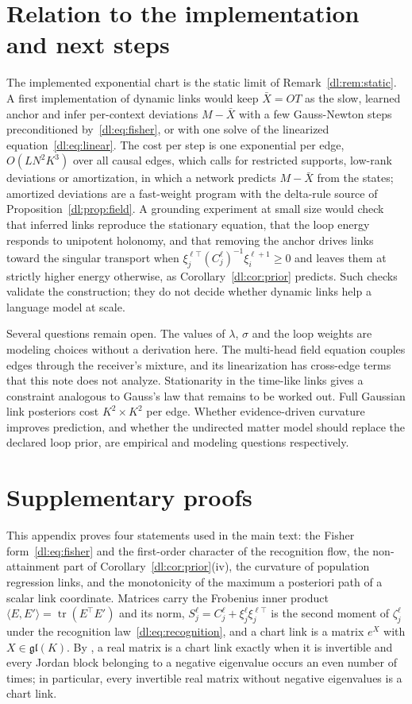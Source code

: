 \documentclass[11pt]{article}
\theoremstyle{definition}
\theoremstyle{remark}
\providecommand{\gl}{\mathfrak{gl}}
\providecommand{\tr}{\operatorname{tr}}
\begin{document}
\section{Relation to the implementation and next steps}
\label{dl:sec:next}

The implemented exponential chart is the static limit of Remark~\ref{dl:rem:static}. A first implementation of dynamic links would keep $\bar X=OT$ as the slow, learned anchor and infer per-context deviations $M-\bar X$ with a few Gauss-Newton steps preconditioned by~\eqref{dl:eq:fisher}, or with one solve of the linearized equation~\eqref{dl:eq:linear}. The cost per step is one exponential per edge, $O(LN^2K^3)$ over all causal edges, which calls for restricted supports, low-rank deviations or amortization, in which a network predicts $M-\bar X$ from the states; amortized deviations are a fast-weight program with the delta-rule source of Proposition~\ref{dl:prop:field}. A grounding experiment at small size would check that inferred links reproduce the stationary equation, that the loop energy responds to unipotent holonomy, and that removing the anchor drives links toward the singular transport when $\xi_j^{\ell\top}(C_j^\ell)^{-1}\xi_i^{\ell+1}\ge0$ and leaves them at strictly higher energy otherwise, as Corollary~\ref{dl:cor:prior} predicts. Such checks validate the construction; they do not decide whether dynamic links help a language model at scale.

Several questions remain open. The values of $\lambda$, $\sigma$ and the loop weights are modeling choices without a derivation here. The multi-head field equation couples edges through the receiver's mixture, and its linearization has cross-edge terms that this note does not analyze. Stationarity in the time-like links gives a constraint analogous to Gauss's law that remains to be worked out. Full Gaussian link posteriors cost $K^2\times K^2$ per edge. Whether evidence-driven curvature improves prediction, and whether the undirected matter model should replace the declared loop prior, are empirical and modeling questions respectively.

\appendix
\section{Supplementary proofs}
\label{dl:app:proofs}

This appendix proves four statements used in the main text: the Fisher form~\eqref{dl:eq:fisher} and the first-order character of the recognition flow, the non-attainment part of Corollary~\ref{dl:cor:prior}(iv), the curvature of population regression links, and the monotonicity of the maximum a posteriori path of a scalar link coordinate. Matrices carry the Frobenius inner product $\langle E,E'\rangle=\tr(E^\top E')$ and its norm, $S_j^\ell=C_j^\ell+\xi_j^\ell\xi_j^{\ell\top}$ is the second moment of $\zeta_j^\ell$ under the recognition law~\eqref{dl:eq:recognition}, and a chart link is a matrix $e^X$ with $X\in\gl(K)$. By \cite[Theorem~1]{dl:culver1966}, a real matrix is a chart link exactly when it is invertible and every Jordan block belonging to a negative eigenvalue occurs an even number of times; in particular, every invertible real matrix without negative eigenvalues is a chart link.
\end{document}
